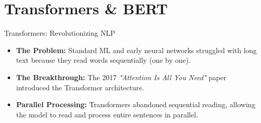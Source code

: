 \documentclass[10pt,aspectratio=169]{beamer}
\begin{document}
	\section{Transformers \& BERT}
	\begin{frame}{Transformers: Revolutionizing NLP}
		\begin{itemize}
			\item \textbf{The Problem:} Standard ML and early neural networks struggled with long text because they read words sequentially (one by one).
			\item \textbf{The Breakthrough:} The 2017 \textit{"Attention Is All You Need"} paper introduced the Transformer architecture.
			\item \textbf{Parallel Processing:} Transformers abandoned sequential reading, allowing the model to read and process entire sentences in parallel.
		\end{itemize}
	\end{frame}
	
\end{document}
